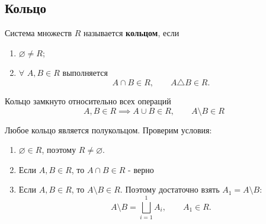 \subsection{Кольцо}
\begin{definition}
    Система множеств $R$ называется \textbf{кольцом}, если
    \begin{enumerate}[label=\arabic*)]
        \item $\varnothing \neq R$;
        \item $\forall$ $A, B \in R$ выполняется
        \[
            A \cap B \in R,
            \qquad
            A \triangle B \in R.
        \]
    \end{enumerate}
\end{definition}
\begin{exercise}[Замечание]
        Кольцо замкнуто относительно всех операций
    \[
        A, B \in R
        \implies
        A \cup B \in R,
        \qquad
        A \setminus B \in R
    \]
    
    \begin{center}
    \end{center}
\end{exercise}

\begin{exercise}[Замечание]
    Любое кольцо является полукольцом.
    Проверим условия:
    \begin{enumerate}[label=\arabic*)]
        \item $\varnothing \in R$, поэтому $R \neq \varnothing$.

        \item Если $A, B \in R$, то $A \cap B \in R$ - верно

        \item Если $A, B \in R$, то $A \setminus B \in R$.
        Поэтому достаточно взять $A_1 = A \setminus B$:
        \[
            A \setminus B = \bigsqcup_{i=1}^{1} A_i,
            \qquad A_1 \in R.
        \]
    \end{enumerate}
\end{exercise}


